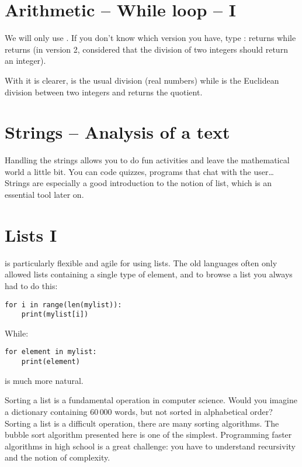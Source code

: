\documentclass[11pt,class=report,crop=false]{standalone}
\begin{document}
\section{Arithmetic -- While loop -- I}

We will only use . If you don't know which version you have, type
:  returns  while  returns  (in version 2, \Python{} considered that the division of two integers should return an integer).

With  it is clearer,  is the usual division (real numbers) while  is the Euclidean division between two integers and returns the quotient.


\section{Strings -- Analysis of a text}

Handling the strings allows you to do fun activities and leave the mathematical world a little bit. You can code quizzes, programs that chat with the user\ldots{}
Strings are especially a good introduction to the notion of list, which is an essential tool later on.



\section{Lists I}

\Python{} is particularly flexible and agile for using lists.
The \og{}old\fg{} languages often only allowed lists containing a single type of element, and to browse a list you always had to do this:
\begin{lstlisting}
for i in range(len(mylist)):
    print(mylist[i])
\end{lstlisting}  
While:
\begin{lstlisting}
for element in mylist:
    print(element)
\end{lstlisting} 
is much more natural.

Sorting a list is a fundamental operation in computer science. Would you imagine a dictionary containing $60\,000$ words, but not sorted in alphabetical order?
Sorting a list is a difficult operation, there are many sorting algorithms. The bubble sort algorithm presented here is one of the simplest. Programming faster algorithms in high school is a great challenge: you have to understand recursivity and the notion of complexity.
\end{document}

